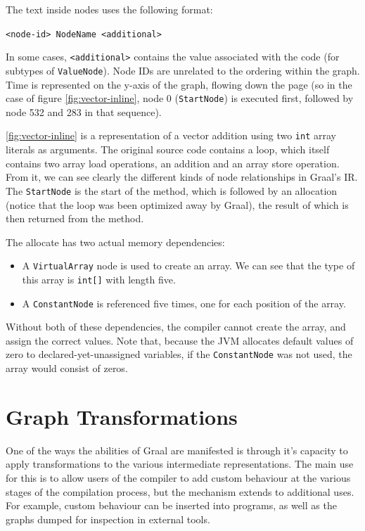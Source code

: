 The text inside nodes uses the following format:

\texttt{<node-id> NodeName <additional>}

In some cases, \texttt{<additional>} contains the value associated with the code (for subtypes of \texttt{ValueNode}). Node IDs are unrelated to the ordering within the graph. Time is represented on the y-axis of the graph, flowing down the page (so in the case of figure \ref{fig:vector-inline}, node 0 (\texttt{StartNode}) is executed first, followed by node 532 and 283 in that sequence).

\autoref{fig:vector-inline} is a representation of a vector addition using two \texttt{int} array literals as arguments. The original source code contains a loop, which itself contains two array load operations, an addition and an array store operation. From it, we can see clearly the different kinds of node relationships in Graal's IR. The \texttt{StartNode} is the start of the method, which is followed by an allocation (notice that the loop was been optimized away by Graal), the result of which is then returned from the method.

The allocate has two actual memory dependencies:

\begin{itemize}
	\item A \texttt{VirtualArray} node is used to create an array. We can see that the type of this array is \texttt{int[]} with length five.
	
	\item A \texttt{ConstantNode} is referenced five times, one for each position of the array.
\end{itemize}

Without both of these dependencies, the compiler cannot create the array, and assign the correct values. Note that, because the JVM allocates default values of zero to declared-yet-unassigned variables, if the \texttt{ConstantNode} was not used, the array would consist of zeros.

\section{Graph Transformations} \label{sec:graal/transformations}
One of the ways the abilities of Graal are manifested is through it's capacity to apply transformations to the various intermediate representations. The main use for this is to allow users of the compiler to add custom behaviour at the various stages of the compilation process, but the mechanism extends to additional uses. For example, custom behaviour can be inserted into programs, as well as the graphs dumped for inspection in external tools.

